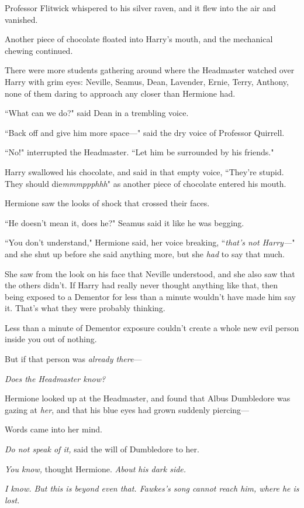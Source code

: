 Professor Flitwick whispered to his silver raven, and it flew into the air and vanished.

Another piece of chocolate floated into Harry's mouth, and the mechanical chewing continued.

There were more students gathering around where the Headmaster watched over Harry with grim eyes: Neville, Seamus, Dean, Lavender, Ernie, Terry, Anthony, none of them daring to approach any closer than Hermione had.

``What can we do?" said Dean in a trembling voice.

``Back off and give him more space---" said the dry voice of Professor Quirrell.

``No!" interrupted the Headmaster. ``Let him be surrounded by his friends."

Harry swallowed his chocolate, and said in that empty voice, ``They're stupid. They should die\emph{mmmppphhh}" as another piece of chocolate entered his mouth.

Hermione saw the looks of shock that crossed their faces.

``He doesn't mean it, does he?" Seamus said it like he was begging.

``You don't understand," Hermione said, her voice breaking, ``\emph{that's not Harry---}" and she shut up before she said anything more, but she \emph{had} to say that much.

She saw from the look on his face that Neville understood, and she also saw that the others didn't. If Harry had really never thought anything like that, then being exposed to a Dementor for less than a minute wouldn't have made him say it. That's what they were probably thinking.

Less than a minute of Dementor exposure couldn't create a whole new evil person inside you out of nothing.

But if that person was \emph{already there}---

\emph{Does the Headmaster know?}

Hermione looked up at the Headmaster, and found that Albus Dumbledore was gazing at \emph{her}, and that his blue eyes had grown suddenly piercing---

Words came into her mind.

\emph{Do not speak of it,} said the will of Dumbledore to her.

\emph{You know,} thought Hermione. \emph{About his dark side.}

\emph{I know. But this is beyond even that. Fawkes's song cannot reach him, where he is lost.}

